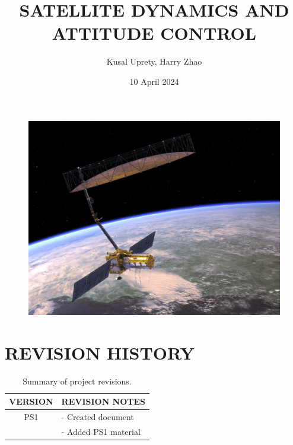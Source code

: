 \documentclass[12pt,a4paper,notitlepage]{article}
\begin{document}
\title{\Huge \textbf{SATELLITE DYNAMICS AND ATTITUDE CONTROL}}
\author{Kusal Uprety, Harry Zhao}
\date{10 April 2024}

\begin{minipage}[h]{\textwidth}
	\vspace{4 cm}
	\advance\leftskip-1in
    \maketitle
\end{minipage}

\begin{figure}[H]
\centering
\includegraphics[scale=0.45]{Images/NISAR.jpg}
\end{figure}

\pagebreak

\section*{\Large REVISION HISTORY}

\begin{table}[h!]
\begin{center}
\begin{tabular} [0.9 \textwidth]{cl}
\hline \hline
\multicolumn{1}{c}{VERSION} & \multicolumn{1}{l}{REVISION NOTES} \\
\hline
PS1 & - Created document \\
    & - Added PS1 material \\
 \hline
\hline \hline
\end{tabular}
	\caption{Summary of project revisions.}
\end{center}
\end{table}
 
\end{document}
